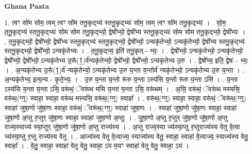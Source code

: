 \documentclass[17pt]{extarticle}
\begin{document}
\textbf{Ghana Paata } \newline

1. त्वꣳ सो॑म सोम॒ त्वम् त्वꣳ सो॑म तनू॒कृद्भ्य॑ स्तनू॒कृद्भ्यः॑ सोम॒ त्वम् त्वꣳ सो॑म तनू॒कृद्भ्यः॑ । . सो॒म॒ त॒नू॒कृद्भ्य॑ स्तनू॒कृद्भ्यः॑ सोम सोम तनू॒कृद्भ्यो॒ द्वेषो᳚भ्यो॒ द्वेषो᳚भ्य स्तनू॒कृद्भ्यः॑ सोम सोम तनू॒कृद्भ्यो॒ द्वेषो᳚भ्यः । . त॒नू॒कृद्भ्यो॒ द्वेषो᳚भ्यो॒ द्वेषो᳚भ्य स्तनू॒कृद्भ्य॑ स्तनू॒कृद्भ्यो॒ द्वेषो᳚भ्यो॒ ऽन्यकृ॑तेभ्यो॒ ऽन्यकृ॑तेभ्यो॒ द्वेषो᳚भ्य स्तनू॒कृद्भ्य॑ स्तनू॒कृद्भ्यो॒ द्वेषो᳚भ्यो॒ ऽन्यकृ॑तेभ्यः । . त॒नू॒कृद्भ्य॒ इति॑ तनू॒कृत् - भ्यः॒ । . द्वेषो᳚भ्यो॒ ऽन्यकृ॑तेभ्यो॒ ऽन्यकृ॑तेभ्यो॒ द्वेषो᳚भ्यो॒ द्वेषो᳚भ्यो॒ ऽन्यकृ॑तेभ्य उ॒रू᳚(1॒)र्व॑न्यकृ॑तेभ्यो॒ द्वेषो᳚भ्यो॒ द्वेषो᳚भ्यो॒ ऽन्यकृ॑तेभ्य उ॒रु । . द्वेषो᳚भ्य॒ इति॒ द्वेषः॑ - भ्यः॒ । . अ॒न्यकृ॑तेभ्य उ॒रू᳚(1॒)र्व॑ न्यकृ॑तेभ्यो॒ ऽन्यकृ॑तेभ्य उ॒रु य॒न्ता य॒न्तोर्व॑ न्यकृ॑तेभ्यो॒ ऽन्यकृ॑तेभ्य उ॒रु य॒न्ता । . अ॒न्यकृ॑तेभ्य॒ इत्य॒न्य - कृ॒ते॒भ्यः॒ । . उ॒रु य॒न्ता य॒न्तो रू॑रु य॒न्ता ऽस्य॑सि य॒न्तो रू॑रु य॒न्ता ऽसि॑ । . य॒न्ता ऽस्य॑सि य॒न्ता य॒न्ता ऽसि॒ वरू॑थं॒ ॅवरू॑थ मसि य॒न्ता य॒न्ता ऽसि॒ वरू॑थम् । . अ॒सि॒ वरू॑थं॒ ॅवरू॑थ मस्यसि॒ वरू॑थ॒(ग्ग्॒) स्वाहा॒ स्वाहा॒ वरू॑थ मस्यसि॒ वरू॑थ॒(ग्ग्॒) स्वाहा᳚ । . वरू॑थ॒(ग्ग्॒) स्वाहा॒ स्वाहा॒ वरू॑थं॒ ॅवरू॑थ॒(ग्ग्॒) स्वाहा॑ जुषा॒णो जु॑षा॒णः स्वाहा॒ वरू॑थं॒ ॅवरू॑थ॒(ग्ग्॒) स्वाहा॑ जुषा॒णः । . स्वाहा॑ जुषा॒णो जु॑षा॒णः स्वाहा॒ स्वाहा॑ जुषा॒णो अ॒प्तु र॒प्तुर् जु॑षा॒णः स्वाहा॒ स्वाहा॑ जुषा॒णो अ॒प्तुः । . जु॒षा॒णो अ॒प्तु र॒प्तुर् जु॑षा॒णो जु॑षा॒णो अ॒प्तु राज्य॒स्याज्य॑ स्या॒प्तुर् जु॑षा॒णो जु॑षा॒णो अ॒प्तु राज्य॑स्य । . अ॒प्तु राज्य॒स्या ज्य॑स्या॒प्तु र॒प्तुराज्य॑स्य वेतु वे॒त्वा ज्य॑स्या॒प्तु र॒प्तु राज्य॑स्य वेतु । . आज्य॑स्य वेतु वे॒त्वाज्य॒ स्याज्य॑स्य वेतु॒ स्वाहा॒ स्वाहा॑ वे॒त्वाज्य॒ स्याज्य॑स्य वेतु॒ स्वाहा᳚ । . वे॒तु॒ स्वाहा॒ स्वाहा॑ वेतु वेतु॒ स्वाहा॒ ऽय म॒यꣳ स्वाहा॑ वेतु वेतु॒ स्वाहा॒ ऽयं । \newline
\end{document}
